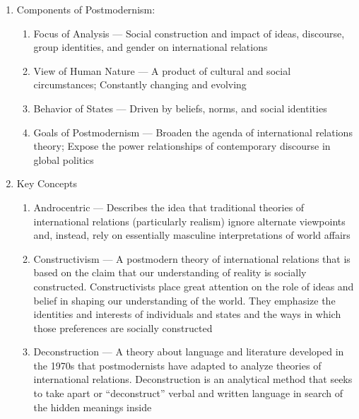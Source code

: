 \documentclass[12pt]{article}
\begin{document}
\begin{enumerate}
\begin{enumerate}
\begin{enumerate}
            \end{enumerate}

        \end{enumerate}

      \item Components of Postmodernism:

        \begin{enumerate}

          \item Focus of Analysis — Social construction and impact of ideas, discourse, group identities, and gender on international relations

          \item View of Human Nature — A product of cultural and social circumstances; Constantly changing and evolving

          \item Behavior of States — Driven by beliefs, norms, and social identities

          \item Goals of Postmodernism — Broaden the agenda of international relations theory; Expose the power relationships of contemporary discourse in global politics 

        \end{enumerate}

      \item Key Concepts

        \begin{enumerate}

          \item Androcentric — Describes the idea that traditional theories of international relations (particularly realism) ignore alternate viewpoints and, instead, rely on essentially masculine interpretations of world affairs

          \item Constructivism — A postmodern theory of international relations that is based on the claim that our understanding of reality is socially constructed. Constructivists place great attention on the role of ideas and belief in shaping our understanding of the world. They emphasize the identities and interests of individuals and states and the ways in which those preferences are socially constructed

          \item Deconstruction — A theory about language and literature developed in the 1970s that postmodernists have adapted to analyze theories of international relations. Deconstruction is an analytical method that seeks to take apart or “deconstruct” verbal and written language in search of the hidden meanings inside


\end{enumerate}
\end{enumerate}
\end{document}
